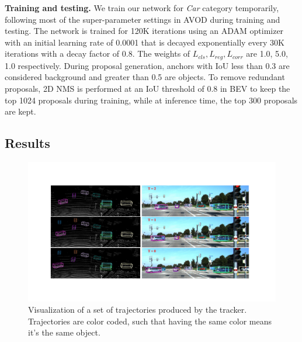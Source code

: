 \documentclass[letterpaper, 10 pt, conference]{ieeeconf}  %
\begin{document}
\textbf{Training and testing.} We train our network for \textit{Car} category temporarily, following most of the super-parameter settings in AVOD\cite{ku2018joint} during training and testing. The network is trained for 120K iterations using an ADAM\cite{kingma2014adam} optimizer with an initial learning rate of 0.0001 that is decayed exponentially every 30K iterations with a decay factor of 0.8. The weights of $L_{cls}, L_{reg}, L_{corr}$ are 1.0, 5.0, 1.0 respectively. During proposal generation, anchors with IoU less than 0.3 are considered background and greater than 0.5 are objects. To remove redundant proposals, 2D NMS is performed at an IoU threshold of 0.8 in BEV to keep the top 1024 proposals during training, while at inference time, the top 300 proposals are kept.

\subsection{Results}

\begin{figure}\centering
	\vspace{-0.6cm}
	\rule{0pt}{1ex}

	\begin{center}
		\includegraphics[trim={3cm, 3cm, 4cm, 3cm}, clip, width=\textwidth]{images/example.pdf}
	\end{center}
	\caption{Visualization of a set of trajectories produced by the tracker. Trajectories are color coded, such that having the same color means it's the same object.}
	\label{fig:examples}
	\vspace{-0.4cm}
\end{figure}
\end{document}
